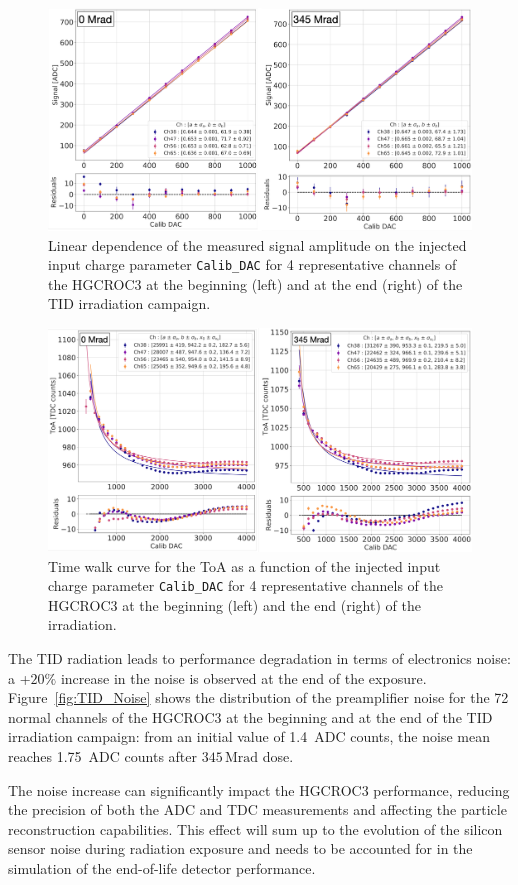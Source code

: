 \begin{figure}
    \centering
    \includegraphics[width=0.7\linewidth]{Figures/HGCAL/TID_ADCLinearity.pdf}
    \caption{Linear dependence of the measured signal amplitude on the injected input charge parameter \texttt{Calib\_DAC} for 4 representative channels of the HGCROC3 at the beginning (left) and at the end (right) of the TID irradiation campaign.}
    \label{fig:TID_ADCLinearity}
\end{figure}

\begin{figure}
    \centering
    \includegraphics[width=0.7\linewidth]{Figures/HGCAL/TID_TimeWalk.pdf}
    \caption{Time walk curve for the ToA as a function of the injected input charge parameter \texttt{Calib\_DAC} for 4 representative channels of the HGCROC3 at the beginning (left) and the end (right) of the irradiation.}
    \label{fig:TID_TimeWalk}
\end{figure}

\bigbreak

The TID radiation leads to performance degradation in terms of electronics noise: a +$20\%$ increase in the noise is observed at the end of the exposure. Figure~\ref{fig:TID_Noise} shows the distribution of the preamplifier noise for the 72 normal channels of the HGCROC3 at the beginning and at the end of the TID irradiation campaign: from an initial value of 1.4~ADC counts, the noise mean reaches 1.75~ADC counts after $345\,\textrm{Mrad}$ dose. 

The noise increase can significantly impact the HGCROC3 performance, reducing the precision of both the ADC and TDC measurements and affecting the particle reconstruction capabilities. This effect will sum up to the evolution of the silicon sensor noise during radiation exposure and needs to be accounted for in the simulation of the end-of-life detector performance.

